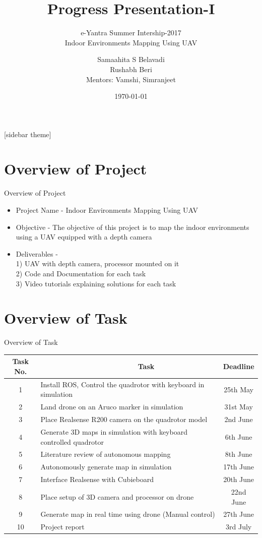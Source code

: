 \documentclass[10pt, a4paper]{beamer}
\begin{document}
	\title{Progress Presentation-I}
	\subtitle{e-Yantra Summer Intership-2017 \\ Indoor Environments Mapping Using UAV}
	\author{Samaahita S Belavadi\\Rushabh Beri\\
	Mentors: Vamshi, Simranjeet}
	\date{\today}
	\frame{\titlepage}

[sidebar theme]
\section{Overview of Project}
\begin{frame}{Overview of Project}
	\begin{itemize}
		\item Project Name - Indoor Environments Mapping Using UAV
		\item Objective - The objective of this project is to map the indoor environments using a UAV equipped with a depth camera
		\item Deliverables -\\
		1) UAV with depth camera, processor mounted on it\\
		2) Code and Documentation for each task\\
		3) Video tutorials explaining solutions for each task
	\end{itemize}
\end{frame}

\section{Overview of Task}
\begin{frame}{Overview of Task}
\begin{tabular}{| c | p{6.5cm} | c | }
\hline
Task No. & ~~~~~~~~~~~~~~~~~~~~~~~~Task & Deadline\\
\hline
  1 & Install ROS, Control the quadrotor with keyboard in simulation & 25th May\\
\hline
2 & Land drone on an Aruco marker in simulation & 31st May\\
\hline
3 & Place Realsense R200 camera on the quadrotor model & 2nd June\\
\hline
4 & Generate 3D maps in simulation with keyboard controlled quadrotor & 6th June\\
\hline
5 & Literature review of autonomous mapping & 8th June\\
\hline
6 & Autonomously generate map in simulation & 17th June\\
\hline
7 & Interface Realsense with Cubieboard & 20th June\\
\hline
8 & Place setup of 3D camera and processor on drone & 22nd June\\
\hline
9 & Generate map in real time using drone (Manual control) & 27th June\\
\hline
10 & Project report & 3rd July\\
\hline
\end{tabular}
\end{frame}
\end{document}
